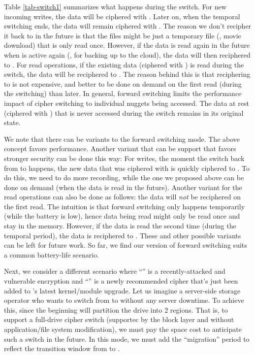 Table \ref{tab-switch1} summarizes what happens during the switch.  For new
incoming writes, the data will be ciphered with \ctwo.  Later on, when the
temporal switching ends, the data will remain ciphered with \ctwo
{}.  The reason we don't recipher it back to \cone in the future
is that the files might be just a temporary file (\eg, movie download)
that is only read once.  However, if the data is read again in the future
when \cone is active again (\eg, for backing up to the cloud), the data will
then reciphered to \cone.
%
For read operations, if the existing data (ciphered with \cone) is read
during the switch, the data will be reciphered to \ctwo.  The reason behind
this is that reciphering to \ctwo is not expensive, and better to be done on
demand on the first read (during the switching) than later. 
%
In general, forward switching limits the performance impact of cipher
switching to individual nuggets being accessed.  The data at rest
(ciphered with \cone) that is never accessed during the switch remains in
its original state.



We note that there can be variants to the forward switching mode. The
above concept favors performance.  Another variant that can be support
that favors stronger security can be done this way: For writes, the moment
the switch back from \ctwo to \cone happens, the new data that was ciphered
with \ctwo is quickly ciphered to \cone.  To do this, we need to do more
recording, while the one we proposed above can be done on demand (when the
data is read in the future).
%
Another variant for the read operations can also be done as follows: the
data will {\em not} be reciphered on the first read.  The intuition is
that forward switching only happens temporarily (while the battery is
low), hence data being read might only be read once and stay in the
memory.  However, if the data is read the second time (during the temporal
period), the data is reciphered to \ctwo.
%
These and other possible variants can be left for future work.  So far, we
find our version of forward switching suits a common battery-life
scenario.





  Next, we consider a different scenario where
``\cone'' is a recently-attacked and vulnerable encryption and ``\ctwo''
is a newly recommended cipher that's just been added to \sys's latest
kernel/module upgrade.  Let us imagine a server-side storage operator who wants to switch
from \cone to \ctwo without any server downtime.  To achieve this, \sys
since the beginning will partition the drive into 2 regions.  That is, to
support a full-drive cipher switch (supportec by the block layer and
without application/file system modification), we must pay the space cost
to anticipate such a switch in the future.  In this mode, we must add the
``migration'' period to reflect the transition window from \cone to \ctwo.


